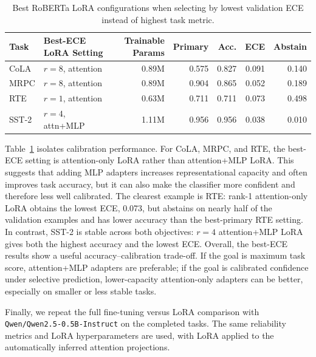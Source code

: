 \begin{table}[t]
\centering
\small
\begin{tabular}{llrrrrr}
\toprule
Task & Best-ECE LoRA Setting & Trainable Params & Primary & Acc. & ECE & Abstain \\
\midrule
CoLA & $r=8$, attention & 0.89M & 0.575 & 0.827 & 0.091 & 0.140 \\
MRPC & $r=8$, attention & 0.89M & 0.904 & 0.865 & 0.052 & 0.189 \\
RTE & $r=1$, attention & 0.63M & 0.711 & 0.711 & 0.073 & 0.498 \\
SST-2 & $r=4$, attn+MLP & 1.11M & 0.956 & 0.956 & 0.038 & 0.010 \\
\bottomrule
\end{tabular}
\caption{Best RoBERTa LoRA configurations when selecting by lowest validation ECE instead of highest task metric.}
\label{tab:lora-best-ece}
\end{table}

Table~\ref{tab:lora-best-ece} isolates calibration performance. For CoLA, MRPC, and RTE, the best-ECE setting is attention-only LoRA rather than attention+MLP LoRA. This suggests that adding MLP adapters increases representational capacity and often improves task accuracy, but it can also make the classifier more confident and therefore less well calibrated. The clearest example is RTE: rank-1 attention-only LoRA obtains the lowest ECE, 0.073, but abstains on nearly half of the validation examples and has lower accuracy than the best-primary RTE setting. In contrast, SST-2 is stable across both objectives: $r=4$ attention+MLP LoRA gives both the highest accuracy and the lowest ECE. Overall, the best-ECE results show a useful accuracy--calibration trade-off. If the goal is maximum task score, attention+MLP adapters are preferable; if the goal is calibrated confidence under selective prediction, lower-capacity attention-only adapters can be better, especially on smaller or less stable tasks.

Finally, we repeat the full fine-tuning versus LoRA comparison with \texttt{Qwen/Qwen2.5-0.5B-Instruct} on the completed tasks. The same reliability metrics and LoRA hyperparameters are used, with LoRA applied to the automatically inferred attention projections.

